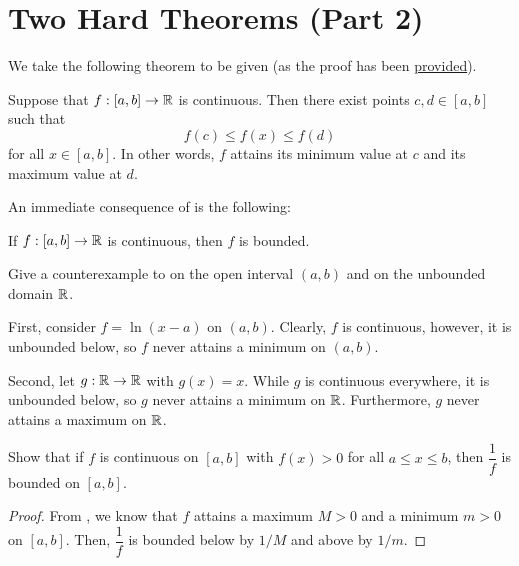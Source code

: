 \section{Two Hard Theorems (Part 2)}


\begin{callout}
  We take the following theorem to be given (as the proof has been
  \href{https://youtu.be/39ntUHbmXpc}{provided}).
  \begin{theorem}
  \label{thm:extreme-value-theorem}
    Suppose that $f : [a, b] \to \mathbb{R}$ is continuous. Then there exist points $c, d \in [a, b]$ such that
    \[
      f(c) \leq f(x) \leq f(d)
    \]
    for all $x \in [a, b]$. In other words, $f$ attains its minimum value at
    $c$ and its maximum value at $d$.
  \end{theorem}

  An immediate consequence of  is the following:

  \begin{theorem}
  \label{thm:boundedness-theorem}
    If $f : [a, b] \to \mathbb{R}$ is continuous, then $f$ is bounded.
  \end{theorem}
\end{callout}

\begin{problem}
  Give a counterexample to  on the open
  interval $(a, b)$ and on the unbounded domain $\mathbb{R}$. 
  
  \vspace{\baselineskip}

  First, consider $f = \ln(x - a)$ on $(a, b)$.  Clearly, $f$ is
  continuous, however, it is unbounded below, so $f$ never attains a minimum on
  $(a, b)$.
  
  Second, let $g : \mathbb{R} \to \mathbb{R}$ with $g(x) = x$. While $g$ is continuous everywhere, it is
  unbounded below, so $g$ never attains a minimum on $\mathbb{R}$. Furthermore, $g$
  never attains a maximum on $\mathbb{R}$.

\end{problem}

\begin{problem}
  Show that if $f$ is continuous on $[a,b]$ with $f(x) > 0$ for all $a \leq x \leq b$,
  then $\dfrac{1}{f}$ is bounded on $[a,b]$. 

  \begin{proof}
    From , we know that $f$ attains a maximum
    $M > 0$ and a minimum $m > 0$ on $[a,b]$. Then, $\dfrac{1}{f}$ is bounded
    below by $1/M$ and above by $1/m$.
  \end{proof}

\end{problem}

